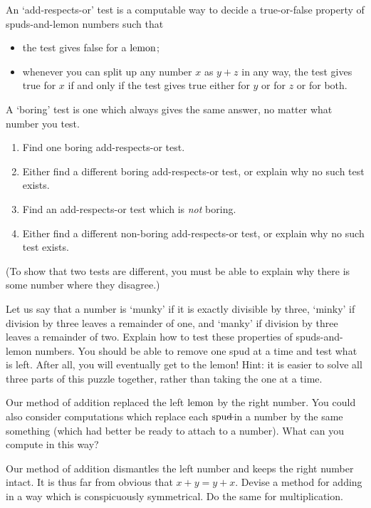 \documentclass{book}
\begin{document}
\begin{puz}
  An `add-respects-or' test is a computable way to decide a true-or-false property of spuds-and-lemon numbers such that
  \begin{itemize}
  \item the test gives false for a $\mbox{lemon}$;
    \item whenever you can split up any number $x$ as $y+z$ in any way, the test gives true for $x$ if and only if the test gives true either for $y$ or for $z$ or for both.
  \end{itemize}
  A `boring' test is one which always gives the same answer, no matter what number you test.
  \begin{enumerate}
  \item Find one boring add-respects-or test.
  \item Either find a different boring add-respects-or test, or explain why no such test exists.
  \item Find an add-respects-or test which is \emph{not} boring.
  \item Either find a different non-boring add-respects-or test, or explain why no such test exists.
  \end{enumerate}
(To show that two tests are different, you must be able to explain why there is some number where they disagree.)
\end{puz}

\begin{puz}
 Let us say that a number is `munky' if it is exactly divisible by three, `minky' if division by three leaves a remainder of one, and `manky' if division by three leaves a remainder of two. Explain how to test these properties of spuds-and-lemon numbers. You should be able to remove one spud at a time and test what is left. After all, you will eventually get to the lemon! Hint: it is easier to solve all three parts of this puzzle together, rather than taking the one at a time.
\end{puz}

\begin{puz}
Our method of addition replaced the left $\mbox{lemon}$ by the right number. You could also consider computations which replace each $\mbox{spud}\!\!\!-\!\!\!$ in a number by the same something (which had better be ready to attach to a number). What can you compute in this way?
\end{puz}

\begin{puz}
Our method of addition dismantles the left number and keeps the right number intact. It is thus far from obvious that $x+y = y+x$. Devise a method for adding in a way which is conspicuously symmetrical. Do the same for multiplication.
\end{puz}
\end{document}
